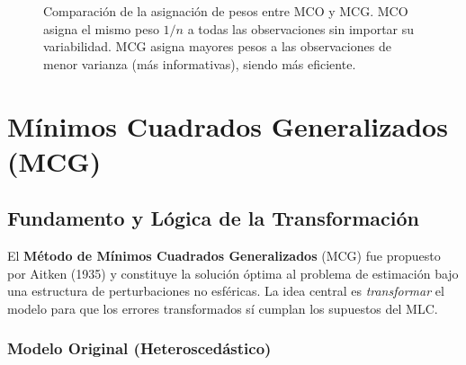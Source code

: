 \documentclass[12pt,a4paper]{report}
\theoremstyle{definition}
\theoremstyle{remark}
\begin{document}
\begin{figure}[H]
  \centering
  \caption{Comparación de la asignación de pesos entre MCO y MCG. MCO asigna el mismo peso $1/n$ a todas las observaciones sin importar su variabilidad. MCG asigna mayores pesos a las observaciones de menor varianza (más informativas), siendo más eficiente.}
  \label{fig:pesos_mco_mcg}
\end{figure}

\section{Mínimos Cuadrados Generalizados (MCG)}

\subsection{Fundamento y Lógica de la Transformación}

El \textbf{Método de Mínimos Cuadrados Generalizados} (MCG) fue propuesto por Aitken (1935) y constituye la solución óptima al problema de estimación bajo una estructura de perturbaciones no esféricas. La idea central es \textit{transformar} el modelo para que los errores transformados sí cumplan los supuestos del MLC.

\subsubsection{Modelo Original (Heteroscedástico)}
\end{document}
